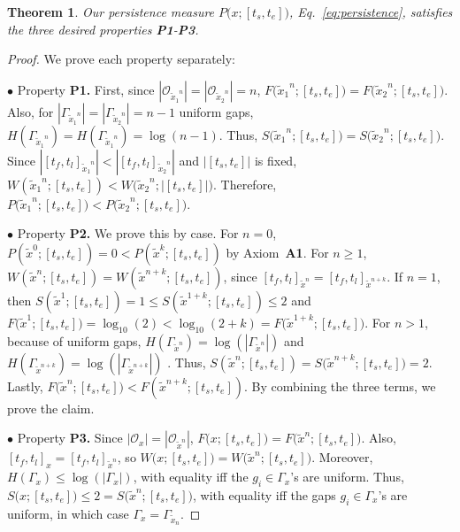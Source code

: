 \documentclass[sigconf]{acmart}
\newtheorem{theorem}{Theorem}
\newcommand{\pattern}{x}
\newcommand{\x}{x}
\newcommand{\uniformx}{\tilde{\x}}
\newcommand{\intervalStart}{t_s}
\newcommand{\intervalEnd}{t_e}
\newcommand{\interval}{[\intervalStart, \intervalEnd]}
\newcommand{\intervalWidth}{|\interval|}
\newcommand{\occs}{\mathcal{O}}
\newcommand{\firstOcc}{t_f}
\newcommand{\lastOcc}{t_l}
\newcommand{\occInterval}{[\firstOcc,\lastOcc]}
\newcommand{\freq}{F}
\newcommand{\freqLong}{\freq\big(x;\interval\big)}
\newcommand{\width}{W}
\newcommand{\widthLong}{\width\big(\pattern; \interval\big)}
\newcommand{\spread}{S}
\newcommand{\spreadLong}{\spread\big(\pattern; \interval\big)}
\newcommand{\entropy}{H}
\newcommand{\persistence}{P}
\newcommand{\persistenceLong}{P\big(x;[\intervalStart,\intervalEnd]\big)}
\newcommand{\gaps}{\Gamma}
\newcommand{\gap}{g}
\newcommand{\axiomOne}{\textbf{A1}}
\newcommand{\propOne}{\textbf{P1}}
\newcommand{\propTwo}{\textbf{P2}}
\newcommand{\propThree}{\textbf{P3}}
\begin{document}
\begin{theorem}
    \label{theorem:prop1}
    Our persistence measure $\persistenceLong$, Eq.~\eqref{eq:persistence}, satisfies the three desired properties \propOne-\propThree.
\end{theorem}

\begin{proof}
    We prove each property separately:
    
    $\bullet$  Property \textbf{\propOne.} 
    First, since $|\occs_{{\uniformx_1}^n}| = |\occs_{{\uniformx_2}^n}| = n$, $\freq\big({\uniformx_1}^n;\interval\big) = \freq\big({\uniformx_2}^n;\interval\big)$. Also, for 
    $|\gaps_{{\uniformx_1}^n}| = |\gaps_{{\uniformx_2}^n}| = n - 1$ uniform gaps, $\entropy(\gaps_{{\uniformx_1}^n}) = \entropy(\gaps_{{\uniformx_1}^n}) = \log(n - 1)$. Thus, $\spread\big({\uniformx_1}^n;\interval\big) = \spread\big({\uniformx_2}^n;\interval\big)$. 
    Since $|\occInterval_{{\uniformx_1}^n}| < |\occInterval_{{\uniformx_2}^n}|$ and $\intervalWidth$ is fixed, $\width({\uniformx_1}^n;\interval) < \width\big({\uniformx_2}^n;\intervalWidth\big)$. Therefore, $\persistence\big({\uniformx_1}^n;\interval\big) < \persistence\big({\uniformx_2}^n;\interval\big)$.
    
    
    
    {
    $\bullet$ Property \textbf{\propTwo.} We prove this by case. For $n = 0$, $\persistence(\uniformx^0;\interval) = 0 < \persistence(\uniformx^{k};\interval)$ by Axiom~\axiomOne. 
    For $n \geq 1$,
    $\width(\uniformx^n;\interval) = \width(\uniformx^{n+k};\interval)$, since $\occInterval_{\uniformx^n} = \occInterval_{\uniformx^{n+k}}$.
    If $n = 1$, then $\spread(\uniformx^1;\interval) = 1 \leq \spread(\uniformx^{1+k};\interval) \leq 2$ and $\freq\big(\uniformx^1;\interval\big) = \log_{10}(2) < \log_{10}(2+k) = \freq\big(\uniformx^{1+k};\interval\big)$.
    For $n > 1$, because of uniform gaps, $\entropy(\gaps_{\uniformx^n}) = \log(|\gaps_{\uniformx^n}|)$ and $\entropy(\gaps_{\uniformx^{n+k}}) = \log(|\gaps_{\uniformx^{n+k}}|)$ \cite{cover2012elements}.  
    Thus, $\spread(\uniformx^{n};\interval) = \spread\big(\uniformx^{n+k};\interval\big) = 2$. 
    Lastly, $\freq\big(\uniformx^n;\interval\big) < \freq(\uniformx^{n+k};\interval)$. 
    By combining the three terms, we prove the claim. }
    
     $\bullet$  Property \textbf{\propThree.} Since $|\occs_\x| = |\occs_{\uniformx^n}|$, $\freqLong = \freq\big(\uniformx^n;\interval\big)$. 
     Also, $\occInterval_\x = \occInterval_{\uniformx^n}$, so $\widthLong = \width\big(\uniformx^n;\interval\big)$. 
     Moreover, $\entropy(\gaps_\x) \leq \log(|\gaps_\x|)$, with equality iff the $\gap_i \in \gaps_\x$'s are uniform. 
     Thus, $\spreadLong \leq 2 = \spread\big(\uniformx^n;\interval\big)$, with equality iff the gaps $\gap_i \in \gaps_\x$'s are uniform, in which case $\gaps_\x = \gaps_{\uniformx_n}$. \qedhere
     
    
\end{proof}
\end{document}
